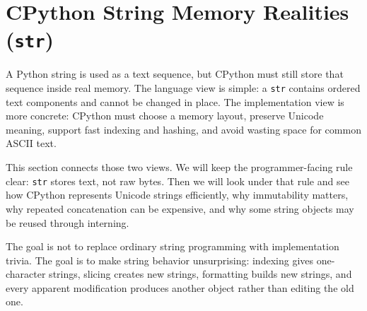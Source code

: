 \section{CPython String Memory Realities (\texttt{str})}

A Python string is used as a text sequence, but CPython must still store that sequence inside real memory. The language view is simple: a \texttt{str} contains ordered text components and cannot be changed in place. The implementation view is more concrete: CPython must choose a memory layout, preserve Unicode meaning, support fast indexing and hashing, and avoid wasting space for common ASCII text.

This section connects those two views. We will keep the programmer-facing rule clear: \texttt{str} stores text, not raw bytes. Then we will look under that rule and see how CPython represents Unicode strings efficiently, why immutability matters, why repeated concatenation can be expensive, and why some string objects may be reused through interning.

The goal is not to replace ordinary string programming with implementation trivia. The goal is to make string behavior unsurprising: indexing gives one-character strings, slicing creates new strings, formatting builds new strings, and every apparent modification produces another object rather than editing the old one.